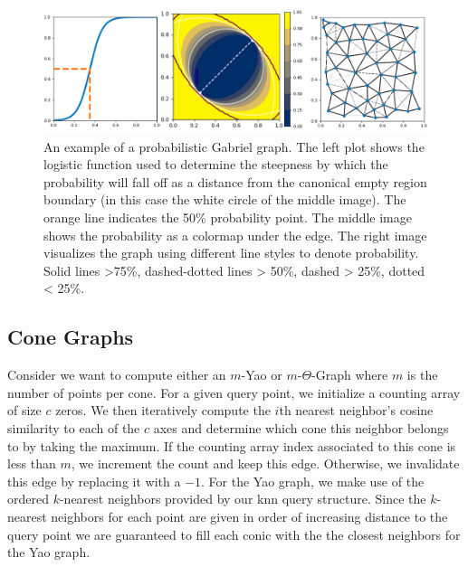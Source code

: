 \begin{figure}
    \includegraphics[width=\linewidth]{figs/chap7/probabilistic_beta.png}
    \caption{An example of a probabilistic Gabriel graph.
    The left plot shows the logistic function used to determine the steepness by which the probability will fall off as a distance from the canonical empty region boundary (in this case the white circle of the middle image).
    The orange line indicates the 50\% probability point.
    The middle image shows the probability as a colormap under the edge.
    The right image visualizes the graph using different line styles to denote probability.
    Solid lines >75\%, dashed-dotted lines > 50\%, dashed > 25\%, dotted < 25\%.}
    \label{fig:probabilistic_beta}
\end{figure}

\subsection{Cone Graphs}

Consider we want to compute either an $m$-Yao or $m$-$\Theta$-Graph where $m$ is the number of points per cone.
%
For a given query point, we initialize a counting array of size $c$ zeros.
%
We then iteratively compute the $i$th nearest neighbor's cosine similarity to each of the $c$ axes and determine which cone this neighbor belongs to by taking the maximum.
%
If the counting array index associated to this cone is less than $m$, we increment the count and keep this edge.
%
Otherwise, we invalidate this edge by replacing it with a $-1$.
%
For the Yao graph, we make use of the ordered $k$-nearest neighbors provided by our knn query structure.
%
Since the $k$-nearest neighbors for each point are given in order of increasing distance to the query point we are guaranteed to fill each conic with the the closest neighbors for the Yao graph.

